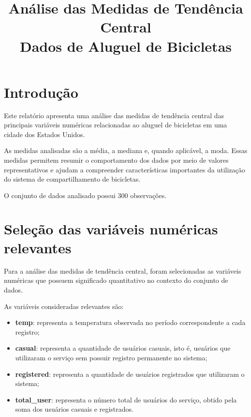 \documentclass[12pt,a4paper]{article}
\title{\textbf{Análise das Medidas de Tendência Central\\
Dados de Aluguel de Bicicletas}}
\author{}
\date{}
\begin{document}
\maketitle

\section{Introdução}

Este relatório apresenta uma análise das medidas de tendência central das
principais variáveis numéricas relacionadas ao aluguel de bicicletas em uma
cidade dos Estados Unidos.

As medidas analisadas são a média, a mediana e, quando aplicável, a moda.
Essas medidas permitem resumir o comportamento dos dados por meio de valores
representativos e ajudam a compreender características importantes da
utilização do sistema de compartilhamento de bicicletas.

O conjunto de dados analisado possui 300 observações.

\section{Seleção das variáveis numéricas relevantes}

Para a análise das medidas de tendência central, foram selecionadas as
variáveis numéricas que possuem significado quantitativo no contexto do
conjunto de dados.

As variáveis consideradas relevantes são:

\begin{itemize}

    \item \textbf{temp}: representa a temperatura observada no período
    correspondente a cada registro;

    \item \textbf{casual}: representa a quantidade de usuários casuais,
    isto é, usuários que utilizaram o serviço sem possuir registro
    permanente no sistema;

    \item \textbf{registered}: representa a quantidade de usuários
    registrados que utilizaram o sistema;

    \item \textbf{total\_user}: representa o número total de usuários do
    serviço, obtido pela soma dos usuários casuais e registrados.

\end{itemize}
\end{document}
